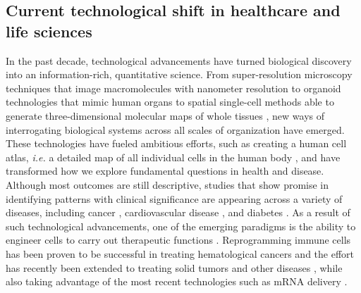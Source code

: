 \documentclass{article}
\begin{document}
\subsection*{Current technological shift in healthcare and life sciences}
In the past decade, technological advancements have turned biological discovery into an information-rich, quantitative science. From super-resolution microscopy techniques that image macromolecules with nanometer resolution \cite{schermelleh2019super} to organoid technologies that mimic human organs \cite{clevers2016modeling} to spatial single-cell methods able to generate three-dimensional molecular maps of whole tissues \cite{kuett2022three}, new ways of interrogating biological systems across all scales of organization have emerged. These technologies have fueled ambitious efforts, such as creating a human cell atlas, \textit{i.e.} a detailed map of all individual cells in the human body \cite{rozenblatt2017human}, and have transformed how we explore fundamental questions in health and disease. Although most outcomes are still descriptive, studies that show promise in identifying patterns with clinical significance are appearing across a variety of diseases, including cancer \cite{patel2014single, wagner2019single, tirosh2016dissecting}, cardiovascular disease \cite{paik2020single}, and diabetes \cite{segerstolpe2016single}. As a result of such technological advancements, one of the emerging paradigms is the ability to engineer cells to carry out therapeutic functions \cite{lim2010designing,fischbach2013cell}. Reprogramming immune cells has been proven to be successful in treating hematological cancers \cite{WALimScienceReview2022,june2018chimeric,weber2020emerging,hong2020engineering,daniels2022decoding} and the effort has recently been extended to treating solid tumors \cite{reinhard2020rna,de2016cancer,kranz2016systemic} and other diseases \cite{mackensen2022anti,rurik2022car,amor2020senolytic,raffin2020treg}, while also taking advantage of the most recent technologies such as mRNA delivery \cite{pardi2018mrna,pardi2020recent}.
\end{document}

